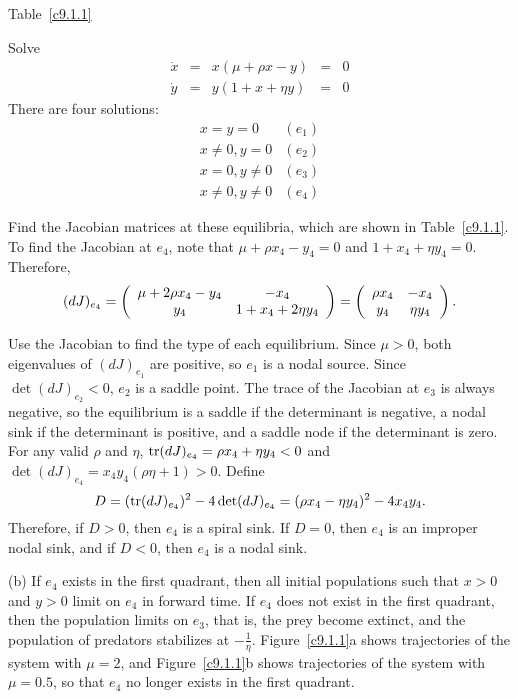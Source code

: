 \documentclass{ximera}
\begin{document}
\begin{exercise}
\begin{solution}
\begin{table}[htb]
\begin{center}
\vspace{0.2in}
Table~\ref{c9.1.1}
\end{center}
\end{table}

\soln
Solve
\[
\begin{array}{rcccl}
\dot{x} & = & x(\mu + \rho x - y) & = & 0 \\
\dot{y} & = & y(1 + x + \eta y) & = & 0 \end{array}
\]
There are four solutions:
\[
\begin{array}{lr}
x = y = 0 & (e_1) \\
x \neq 0, y = 0 & (e_2) \\
x = 0, y \neq 0 & (e_3) \\
x \neq 0, y \neq 0 & (e_4) \end{array}
\]

Find the Jacobian matrices at these equilibria, which are shown in
Table~\ref{c9.1.1}.  To find the Jacobian at $e_4$, note that
$\mu + \rho x_4 - y_4 = 0$ and $1 + x_4 + \eta y_4 = 0$.  Therefore,
\[
(dJ)_{e_4} = \left(\begin{array}{cc} \mu + 2\rho x_4 - y_4 & -x_4\\ y_4 &1 + x_4 +
2\eta y_4\end{array}\right) = \left(\begin{array}{cc} \rho x_4 & -x_4\\ y_4 &\eta y_4\end{array}\right).
\]

Use the Jacobian to find the type of each equilibrium.  Since $\mu > 0$,
both eigenvalues of $(dJ)_{e_1}$ are positive, so $e_1$ is a nodal source. 
Since $\det(dJ)_{e_2} < 0$, $e_2$ is a saddle point.  The trace of the
Jacobian at $e_3$ is always negative, so the equilibrium is a saddle if the
determinant is negative, a nodal sink if the determinant is positive, and
a saddle node if the determinant is zero.
For any valid $\rho$ and $\eta$, ${\rm tr}(dJ)_{e_4} = \rho x_4 +
\eta y_4 < 0$ and $\det(dJ)_{e_4} = x_4y_4(\rho\eta + 1) > 0$.
Define
\[
D = ({\rm tr}(dJ)_{e_4})^2 - 4\det(dJ)_{e_4} =
(\rho x_4 - \eta y_4)^2 - 4x_4y_4.
\]
Therefore, if $D > 0$, then $e_4$ is a spiral sink.  If $D = 0$, then
$e_4$ is an improper nodal sink, and if $D < 0$, then $e_4$ is a nodal
sink.

(b) If $e_4$ exists in the first quadrant, then all initial
populations such that $x > 0$ and $y > 0$ limit on $e_4$ in forward time. 
If $e_4$ does not exist in the first quadrant, then the population limits on
$e_3$, that is, the prey become extinct, and the population of predators
stabilizes at $-\frac{1}{\eta}$.  Figure~\ref{c9.1.1}a shows trajectories
of the system with $\mu = 2$, and Figure~\ref{c9.1.1}b shows trajectories
of the system with $\mu = 0.5$, so that $e_4$ no longer exists in the first
quadrant.

\begin{figure}[htb]
                       \centerline{%
                       }
\end{figure}

\end{solution}
\end{exercise}
\end{document}
